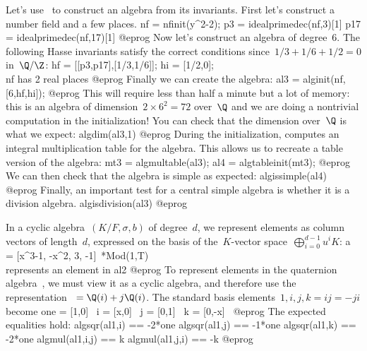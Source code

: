 Let's use~ to construct an algebra from its invariants. First let's
construct a number field and a few places.
\bprog
nf = nfinit(y^2-2);
p3 = idealprimedec(nf,3)[1]
p17 = idealprimedec(nf,17)[1]
@eprog\noindent
Now let's construct an algebra of degree~$6$. The following Hasse invariants
satisfy the correct conditions since~$1/3+1/6+1/2=0$ in~$\Q/\Z$:
\bprog
hf = [[p3,p17],[1/3,1/6]]; hi = [1/2,0]; \\ nf has 2 real places
@eprog\noindent
Finally we can create the algebra:
\bprog
al3 = alginit(nf,[6,hf,hi]);
@eprog\noindent
This will require less than half a minute but a lot of memory:
this is an algebra of dimension~$2\times 6^2 = 72$ over~$\Q$ and we
are doing a nontrivial computation in the initialization! You can check that the
dimension over~$\Q$ is what we expect:
\bprog
algdim(al3,1)
@eprog\noindent
During the initialization,  computes an integral multiplication table
for the algebra. This allows us to recreate a table version of the algebra:
\bprog
mt3 = algmultable(al3);
al4 = algtableinit(mt3);
@eprog\noindent
We can then check that the algebra is simple as expected:
\bprog
algissimple(al4)
@eprog\noindent
Finally, an important test for a central simple algebra is whether it is a
division algebra.
\bprog
algisdivision(al3)
@eprog


In a cyclic algebra~$(K/F,\sigma,b)$ of degree~$d$, we represent elements as
column vectors of length~$d$, expressed on the basis of the~$K$-vector
space~$\bigoplus_{i=0}^{d-1}u^iK$:
\bprog
a = [x^3-1, -x^2, 3, -1]~*Mod(1,T) \\represents an element in al2
@eprog\noindent
To represent elements in the quaternion algebra~, we must view it as a
cyclic algebra, and therefore use the representation~ $ =
\Q(i)+j\Q(i)$. The standard basis elements~$1,i,j,k=ij=-ji$ become
\bprog
one = [1,0]~
i = [x,0]~
j = [0,1]~
k = [0,-x]~
@eprog\noindent
The expected equalities hold:
\bprog
algsqr(al1,i) == -2*one
algsqr(al1,j) == -1*one
algsqr(al1,k) == -2*one
algmul(al1,i,j) == k
algmul(al1,j,i) == -k
@eprog\noindent

